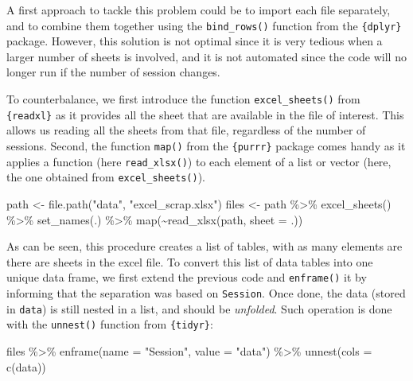 \documentclass[
]{book}
\newenvironment{Shaded}{\begin{snugshade}}{\end{snugshade}}
\newcommand{\AttributeTok}[1]{\textcolor[rgb]{0.77,0.63,0.00}{#1}}
\newcommand{\FunctionTok}[1]{\textcolor[rgb]{0.00,0.00,0.00}{#1}}
\newcommand{\NormalTok}[1]{#1}
\newcommand{\OtherTok}[1]{\textcolor[rgb]{0.56,0.35,0.01}{#1}}
\newcommand{\SpecialCharTok}[1]{\textcolor[rgb]{0.00,0.00,0.00}{#1}}
\newcommand{\StringTok}[1]{\textcolor[rgb]{0.31,0.60,0.02}{#1}}
\begin{document}
A first approach to tackle this problem could be to import each file separately, and to combine them together using the \texttt{bind\_rows()} function from the \texttt{\{dplyr\}} package. However, this solution is not optimal since it is very tedious when a larger number of sheets is involved, and it is not automated since the code will no longer run if the number of session changes.

To counterbalance, we first introduce the function \texttt{excel\_sheets()} from \texttt{\{readxl\}} as it provides all the sheet that are available in the file of interest. This allows us reading all the sheets from that file, regardless of the number of sessions. Second, the function \texttt{map()} from the \texttt{\{purrr\}} package comes handy as it applies a function (here \texttt{read\_xlsx()}) to each element of a list or vector (here, the one obtained from \texttt{excel\_sheets()}).

\begin{Shaded}
\begin{Highlighting}[]
\NormalTok{path }\OtherTok{\textless{}{-}} \FunctionTok{file.path}\NormalTok{(}\StringTok{"data"}\NormalTok{, }\StringTok{"excel\_scrap.xlsx"}\NormalTok{) }
\NormalTok{files }\OtherTok{\textless{}{-}}\NormalTok{ path }\SpecialCharTok{\%\textgreater{}\%} 
  \FunctionTok{excel\_sheets}\NormalTok{() }\SpecialCharTok{\%\textgreater{}\%} 
  \FunctionTok{set\_names}\NormalTok{(.) }\SpecialCharTok{\%\textgreater{}\%} 
  \FunctionTok{map}\NormalTok{(}\SpecialCharTok{\textasciitilde{}}\FunctionTok{read\_xlsx}\NormalTok{(path, }\AttributeTok{sheet =}\NormalTok{ .))}
\end{Highlighting}
\end{Shaded}

As can be seen, this procedure creates a list of tables, with as many elements are there are sheets in the excel file. To convert this list of data tables into one unique data frame, we first extend the previous code and \texttt{enframe()} it by informing that the separation was based on \texttt{Session}. Once done, the data (stored in \texttt{data}) is still nested in a list, and should be \emph{unfolded}. Such operation is done with the \texttt{unnest()} function from \texttt{\{tidyr\}}:

\begin{Shaded}
\begin{Highlighting}[]
\NormalTok{files }\SpecialCharTok{\%\textgreater{}\%} 
  \FunctionTok{enframe}\NormalTok{(}\AttributeTok{name =} \StringTok{"Session"}\NormalTok{, }\AttributeTok{value =} \StringTok{"data"}\NormalTok{) }\SpecialCharTok{\%\textgreater{}\%} 
  \FunctionTok{unnest}\NormalTok{(}\AttributeTok{cols =} \FunctionTok{c}\NormalTok{(data))}
\end{Highlighting}
\end{Shaded}
\end{document}
